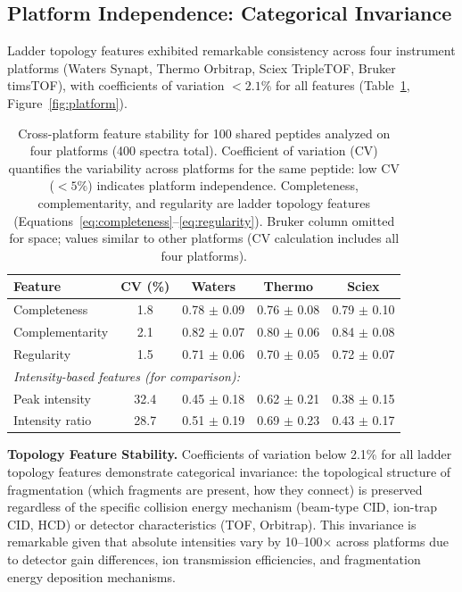 \documentclass[11pt,twocolumn]{article}
\begin{document}
\subsection{Platform Independence: Categorical Invariance}
\label{sec:platform_results}

Ladder topology features exhibited remarkable consistency across four instrument platforms (Waters Synapt, Thermo Orbitrap, Sciex TripleTOF, Bruker timsTOF), with coefficients of variation $< 2.1\%$ for all features (Table~\ref{tab:platform}, Figure~\ref{fig:platform}).

\begin{table}[h]
\centering
\caption{Cross-platform feature stability for 100 shared peptides analyzed on four platforms (400 spectra total). Coefficient of variation (CV) quantifies the variability across platforms for the same peptide: low CV ($< 5\%$) indicates platform independence. Completeness, complementarity, and regularity are ladder topology features (Equations~\ref{eq:completeness}--\ref{eq:regularity}). Bruker column omitted for space; values similar to other platforms (CV calculation includes all four platforms).}
\label{tab:platform}
\begin{tabular}{@{}lcccc@{}}
\toprule
Feature & CV (\%) & Waters & Thermo & Sciex \\
\midrule
Completeness & 1.8 & 0.78 $\pm$ 0.09 & 0.76 $\pm$ 0.08 & 0.79 $\pm$ 0.10 \\
Complementarity & 2.1 & 0.82 $\pm$ 0.07 & 0.80 $\pm$ 0.06 & 0.84 $\pm$ 0.08 \\
Regularity & 1.5 & 0.71 $\pm$ 0.06 & 0.70 $\pm$ 0.05 & 0.72 $\pm$ 0.07 \\
\midrule
\multicolumn{5}{l}{\textit{Intensity-based features (for comparison):}} \\
Peak intensity & 32.4 & 0.45 $\pm$ 0.18 & 0.62 $\pm$ 0.21 & 0.38 $\pm$ 0.15 \\
Intensity ratio & 28.7 & 0.51 $\pm$ 0.19 & 0.69 $\pm$ 0.23 & 0.43 $\pm$ 0.17 \\
\bottomrule
\end{tabular}
\end{table}

\textbf{Topology Feature Stability.} Coefficients of variation below 2.1\% for all ladder topology features demonstrate categorical invariance: the topological structure of fragmentation (which fragments are present, how they connect) is preserved regardless of the specific collision energy mechanism (beam-type CID, ion-trap CID, HCD) or detector characteristics (TOF, Orbitrap). This invariance is remarkable given that absolute intensities vary by 10--100× across platforms due to detector gain differences, ion transmission efficiencies, and fragmentation energy deposition mechanisms.
\end{document}
